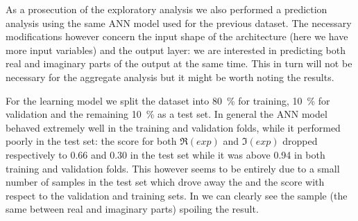 As a prosecution of the exploratory analysis we also performed a prediction analysis using the same ANN model used for the previous dataset.
The necessary modifications however concern the input shape of the architecture (here we have more input variables) and the output layer: we are interested in predicting both real and imaginary parts of the output at the same time.
This in turn will not be necessary for the aggregate analysis but it might be worth noting the results.

For the learning model we split the dataset into \SI{80}{\percent} for training, \SI{10}{\percent} for validation and the remaining \SI{10}{\percent} as a test set.
In general the ANN model behaved extremely well in the training and validation folds, while it performed poorly in the test set: the \rr score for both $\Re(exp)$ and $\Im(exp)$ dropped respectively to \num{0.66} and \num{0.30} in the test set while it was above \num{0.94} in both training and validation folds.\footnotemark{}
This however seems to be entirely due to a small number of samples in the test set which drove away the \mse and the \rr score with respect to the validation and training sets.
In  we can clearly see the sample (the same between real and imaginary parts) spoiling the result.

